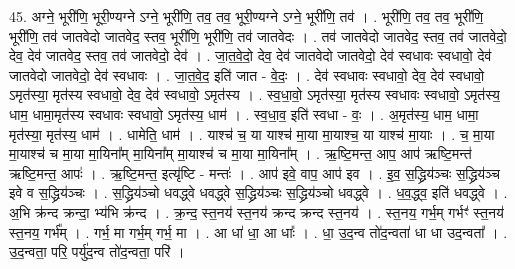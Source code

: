 \documentclass[17pt]{extarticle}
\begin{document}
45. अग्ने॒ भूरी॑णि॒ भूरी॒ण्यग्ने ऽग्ने॒ भूरी॑णि॒ तव॒ तव॒ भूरी॒ण्यग्ने ऽग्ने॒ भूरी॑णि॒ तव॑ । . भूरी॑णि॒ तव॒ तव॒ भूरी॑णि॒ भूरी॑णि॒ तव॑ जातवेदो जातवेद॒ स्तव॒ भूरी॑णि॒ भूरी॑णि॒ तव॑ जातवेदः । . तव॑ जातवेदो जातवेद॒ स्तव॒ तव॑ जातवेदो॒ देव॒ देव॑ जातवेद॒ स्तव॒ तव॑ जातवेदो॒ देव॑ । . जा॒त॒वे॒दो॒ देव॒ देव॑ जातवेदो जातवेदो॒ देव॑ स्वधावः स्वधावो॒ देव॑ जातवेदो जातवेदो॒ देव॑ स्वधावः । . जा॒त॒वे॒द॒ इति॑ जात - वे॒दः॒ । . देव॑ स्वधावः स्वधावो॒ देव॒ देव॑ स्वधावो॒ ऽमृत॑स्या॒ मृत॑स्य स्वधावो॒ देव॒ देव॑ स्वधावो॒ ऽमृत॑स्य । . स्व॒धा॒वो॒ ऽमृत॑स्या॒ मृत॑स्य स्वधावः स्वधावो॒ ऽमृत॑स्य॒ धाम॒ धामा॒मृत॑स्य स्वधावः स्वधावो॒ ऽमृत॑स्य॒ धाम॑ । . स्व॒धा॒व॒ इति॑ स्वधा - वः॒ । . अ॒मृत॑स्य॒ धाम॒ धामा॒ मृत॑स्या॒ मृत॑स्य॒ धाम॑ । . धामेति॒ धाम॑ । . याश्च॑ च॒ या याश्च॑ मा॒या मा॒याश्च॒ या याश्च॑ मा॒याः । . च॒ मा॒या मा॒याश्च॑ च मा॒या मा॒यिना᳚म् मा॒यिना᳚म् मा॒याश्च॑ च मा॒या मा॒यिना᳚म् । . ऋ॒ष्टि॒मन्त॒ आप॒ आप॑ ऋष्टि॒मन्त॑ ऋष्टि॒मन्त॒ आपः॑ । . ऋ॒ष्टि॒मन्त॒ इत्यृ॑ष्टि - मन्तः॑ । . आप॑ इवे॒ वाप॒ आप॑ इव । . इ॒व॒ स॒द्ध्रिय॑ञ्चः स॒द्ध्रिय॑ञ्च इवे व स॒द्ध्रिय॑ञ्चः । . स॒द्ध्रिय॑ञ्चो धवद्ध्वे धवद्ध्वे स॒द्ध्रिय॑ञ्चः स॒द्ध्रिय॑ञ्चो धवद्ध्वे । . ध॒व॒द्ध्व॒ इति॑ धवद्ध्वे । . अ॒भि क्र॑न्द क्रन्दा॒ भ्य॑भि क्र॑न्द । . क्र॒न्द॒ स्त॒नय॑ स्त॒नय॑ क्रन्द क्रन्द स्त॒नय॑ । . स्त॒नय॒ गर्भ॒म् गर्भꣳ॑ स्त॒नय॑ स्त॒नय॒ गर्भ᳚म् । . गर्भ॒ मा गर्भ॒म् गर्भ॒ मा । . आ धा॑ धा॒ आ धाः᳚ । . धा॒ उ॒द॒न्व तो॑द॒न्वता॑ धा धा उद॒न्वता᳚ । . उ॒द॒न्वता॒ परि॒ पर्यु॑द॒न्व तो॑द॒न्वता॒ परि॑ । \newline
\end{document}
